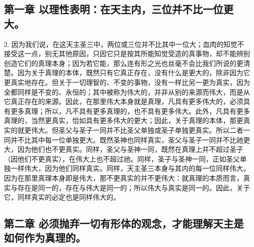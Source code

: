 
\subsection{第一章 以理性表明：在天主内，三位并不比一位更大。}

2. 因为我们说，在这天主圣三中，两位或三位并不比其中一位大；血肉的知觉不接受这一点，别无其他原因，只因它只是按其所能知觉受造的真事物，却不能辨别创造它们的真理本身；因为若它能，那么连有形之光也丝毫不会比我们所说的更清楚。因为关于真理的本体，既然只有它真正存在，没有什么是更大的，除非因为它更真实地存在。但关于一切理智的、不变的事物，没有一样比另一更为真实，因为全都同样是不变的、永恒的；其中被称为伟大的，并非从别的来源而伟大，而是从它真正存在的来源。因此，在那里伟大本身就是真理，凡具有更多伟大的，必须具有更多真理；所以，凡不具有更多真理的，也不具有更多伟大。此外，凡具有更多真理的，当然更真实，恰如具有更多伟大的更大；因此，关于真理的本体，那更真实的就更伟大。但圣父与圣子一同并不比圣父单独或圣子单独更真实。所以二者一同并不比其中每一位单独更大。既然圣神也同样真实，圣父与圣子一同并不比祂更大，因为他们也不更真实。同样，圣父与圣神一同，既然在真理上并不超过圣子（因他们不更真实），在伟大上也不超过祂。同样，圣子与圣神一同，正如圣父单独一样伟大，因为他们同样真实。同样，天主圣三本身与其内的每一位同样伟大。因为在那里真理本身即是伟大，那不更真实的并不更伟大：就真理的本质而言，真实与存在是同一的，存在与伟大是同一的；所以伟大与真实是同一的。因此，关于它，同样真实的必定也是同样伟大的。\par


\subsection{第二章 必须抛弃一切有形体的观念，才能理解天主是如何作为真理的。}

